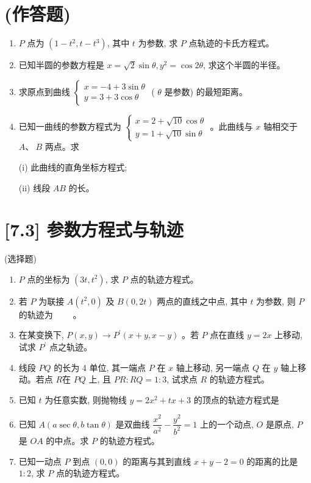 \documentclass[10pt]{article}
\begin{document}
\section*{(作答题)}
\begin{enumerate}
  \item $P$ 点为 $\left(1-t^{2}, t-t^{3}\right)$, 其中 $t$ 为参数, 求 $P$ 点轨迹的卡氏方程式。
  \item 已知半圆的参数方程是 $x=\sqrt{2} \sin \theta, y^{2}=\cos 2 \theta$, 求这个半圆的半径。
  \item 求原点到曲线 $\left\{\begin{array}{l}x=-4+3 \sin \theta \\ y=3+3 \cos \theta\end{array}\right.$ ( $\theta$ 是参数) 的最短距离。
  \item 已知一曲线的参数方程式为 $\left\{\begin{array}{l}x=2+\sqrt{10} \cos \theta \\ y=1+\sqrt{10} \sin \theta\end{array}\right.$ 。此曲线与 $x$ 轴相交于 $A 、 ~B$ 两点。求

(i) 此曲线的直角坐标方程式;

(ii) 线段 $AB$ 的长。

\end{enumerate}

\section*{[7.3] 参数方程式与轨迹}
(选择题)

\begin{enumerate}
  \item $P$ 点的坐标为 $\left(3 t, t^{2}\right)$, 求 $P$ 点的轨迹方程式。
  \item 若 $P$ 为联接 $A\left(t^{2}, 0\right)$ 及 $B(0,2 t)$ 两点的直线之中点, 其中 $t$ 为参数, 则 $P$ 的轨迹为 $\qquad$。
  \item 在某变换下, $P(x, y) \rightarrow P^{\prime}(x+y, x-y)$ 。若 $P$ 点在直线 $y=2 x$ 上移动, 试求 $P^{\prime}$ 点之轨迹。
  \item 线段 $PQ$ 的长为 4 单位, 其一端点 $P$ 在 $x$ 轴上移动, 另一端点 $Q$ 在 $y$ 轴上移动。若点 $R$在 $PQ$ 上, 且 $PR: RQ=1: 3$, 试求点 $R$ 的轨迹方程式。
  \item 已知 $t$ 为任意实数, 则抛物线 $y=2 x^{2}+t x+3$ 的顶点的轨迹方程式是 $\qquad$
  \item 已知 $A(a \sec \theta, b \tan \theta)$ 是双曲线 $\dfrac{x^{2}}{a^{2}}-\dfrac{y^{2}}{b^{2}}=1$ 上的一个动点, $O$ 是原点, $P$ 是 $OA$ 的中点。求 $P$ 的轨迹方程式。
  \item 已知一动点 $P$ 到点 $(0,0)$ 的距离与其到直线 $x+y-2=0$ 的距离的比是 $1: 2$, 求 $P$ 点的轨迹方程式。
\end{enumerate}
\end{document}
